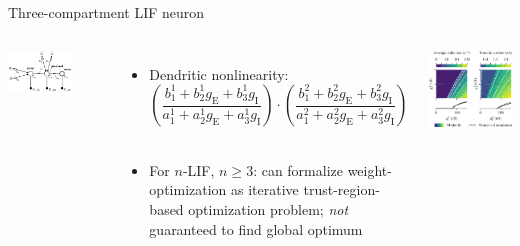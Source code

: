 \documentclass[aspectratio=169]{beamer}
\renewcommand{\emph}[1]{{\color{violet}\textit{#1}}}
\begin{document}
\begin{frame}{Three-compartment LIF neuron}
	\begin{columns}
		{\centering
		\includegraphics[width=0.66\textwidth]{media/n_comp_lif_d.pdf}\\}
		\begin{itemize}
			\item Dendritic nonlinearity:
			$$\left( \frac{b^1_1 + b^1_2 g_\mathrm{E} + b^1_3 g_\mathrm{I}}{a^1_1 + a^1_2 g_\mathrm{E} + a^1_3 g_\mathrm{I}} \right) \cdot
			  \left( \frac{b^2_1 + b^2_2 g_\mathrm{E} + b^2_3 g_\mathrm{I}}{a^2_1 + a^2_2 g_\mathrm{E} + a^2_3 g_\mathrm{I}} \right)
			$$\\[0.25cm]
			\item<2-> For $n$-LIF, $n \geq 3$: can formalize weight-optimization as iterative trust-region-based optimization problem; \emph{not} guaranteed to find global optimum
		\end{itemize}
		\includegraphics[width=\textwidth]{media/three_compartment_nonlinearity.pdf}
	\end{columns}
\end{frame}
\end{document}
